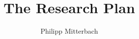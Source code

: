 

\usepackage{lipsum}

\usepackage{booktabs, tabularx}


	



   \title{The Research Plan}
   \author{Philipp Mitterbach}
   \maketitle

   \vspace{5cm}


   

   
   


